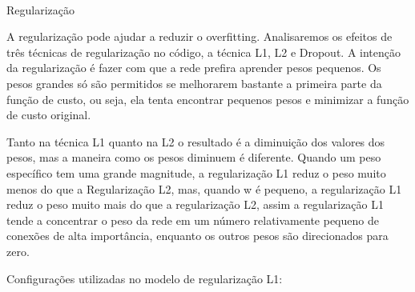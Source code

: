 \documentclass[11pt]{article}
\begin{document}
    \begin{center}
    \end{center}
    { \hspace*{\fill} \\}
    
    Regularização

A regularização pode ajudar a reduzir o overfitting. Analisaremos os
efeitos de três técnicas de regularização no código, a técnica L1, L2 e
Dropout. A intenção da regularização é fazer com que a rede prefira
aprender pesos pequenos. Os pesos grandes só são permitidos se
melhorarem bastante a primeira parte da função de custo, ou seja, ela
tenta encontrar pequenos pesos e minimizar a função de custo original.

Tanto na técnica L1 quanto na L2 o resultado é a diminuição dos valores
dos pesos, mas a maneira como os pesos diminuem é diferente. Quando um
peso específico tem uma grande magnitude, a regularização L1 reduz o
peso muito menos do que a Regularização L2, mas, quando
\textbar{}w\textbar{} é pequeno, a regularização L1 reduz o peso muito
mais do que a regularização L2, assim a regularização L1 tende a
concentrar o peso da rede em um número relativamente pequeno de conexões
de alta importância, enquanto os outros pesos são direcionados para
zero.

Configurações utilizadas no modelo de regularização L1:
\end{document}
